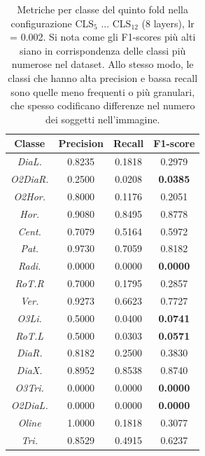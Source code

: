 \begin{table}[p]
    \centering
    \setlength{\tabcolsep}{5pt} %
    \renewcommand{\arraystretch}{1.6} %
    \begin{tabular}{c|c|c|c}
         Classe & \textbf{Precision} & \textbf{Recall} & \textbf{F1-score} \\
         \hline
         \hline
\textit{DiaL.}      &                0.8235   &    0.1818   &    0.2979   \\ 
\textit{O2DiaR.}    &                0.2500   &    0.0208   &    \textbf{0.0385}   \\ 
\textit{O2Hor.}     &                0.8000   &    0.1176   &    0.2051   \\ 
\textit{Hor.}       &                0.9080   &    0.8495   &    0.8778   \\ 
\textit{Cent.}      &                0.7079   &    0.5164   &    0.5972   \\ 
\textit{Pat.}       &                0.9730   &    0.7059   &    0.8182   \\ 
\textit{Radi.}      &                0.0000   &    0.0000   &    \textbf{0.0000}   \\ 
\textit{RoT.R}      &                0.7000   &    0.1795   &    0.2857   \\ 
\textit{Ver.}       &                0.9273   &    0.6623   &    0.7727   \\   
\textit{O3Li.}      &                0.5000   &    0.0400   &    \textbf{0.0741}   \\ 
\textit{RoT.L}      &                0.5000   &    0.0303   &    \textbf{0.0571}   \\
\textit{DiaR.}      &                0.8182   &    0.2500   &    0.3830   \\
\textit{DiaX.}      &                0.8952   &    0.8538   &    0.8740   \\
\textit{O3Tri.}     &                0.0000   &    0.0000   &    \textbf{0.0000}   \\
\textit{O2DiaL.}    &                0.0000   &    0.0000   &    \textbf{0.0000}   \\
\textit{Oline}      &                1.0000   &    0.1818   &    0.3077   \\
\textit{Tri.}       &                0.8529   &    0.4915   &    0.6237   \\
    \end{tabular}
    \caption{Metriche per classe del quinto fold nella configurazione CLS$_5$ ... CLS$_{12}$ (8 layers), lr = 0.002. Si nota come gli F1-scores più alti siano in corrispondenza delle classi più numerose nel dataset. Allo stesso modo, le classi che hanno alta precision e bassa recall sono quelle meno frequenti o più granulari, che spesso codificano differenze nel numero dei soggetti nell'immagine. }
    \label{tab:cls_precision_recall}
\end{table}

